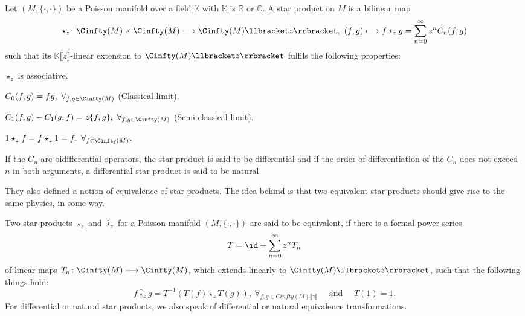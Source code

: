 \begin{definition}
	\label{Def:StarProduct}
	Let $(M, \{\cdot, \cdot\})$ be a Poisson manifold over a field 
	$\mathbb{K}$ with $\mathbb{K}$ is $\mathbb{R}$ or  $\mathbb{C}$.
	A star product on $M$ is a bilinear map
	\begin{equation*}
	    \star_z \colon 
    	\Cinfty(M) 
    	\times 
	    \Cinfty(M) 
	    \longrightarrow
	    \Cinfty(M) \llbracket z \rrbracket
	    , \
	    (f,g) 
	    \longmapsto 
	    f \star_z g 
	    =
	    \sum\limits_{n = 0}^\infty 
	    z^n C_n(f,g)
	\end{equation*}
	such that its $\mathbb{K}\llbracket z \rrbracket$-linear extension to 
	$\Cinfty(M) \llbracket z \rrbracket$ fulfils the following properties:
	\begin{definitionlist}
		\item
		$\star_z$ is associative.
		
		\item
		$C_0(f, g) = f g,\ \forall_{f,g \in \Cinfty(M)}$ (Classical limit).
		
		\item
		$C_1(f, g) - C_1(g, f)= z \{f, g\},\ \forall_{f,g \in \Cinfty(M)}$
		(Semi-classical limit).
		
		\item
		$1 \star_z f = f \star_z 1 = f,\ \forall_{f \in \Cinfty(M)}$.
	\end{definitionlist}
	If the $C_n$ are bidifferential operators, the star product is said to be 
	differential and if the order of differentiation of the $C_n$ does not 
	exceed $n$ in both arguments, a differential star product is said to be 
	natural.
\end{definition}
They also defined a notion of equivalence of star products. The idea behind is 
that two equivalent star products should give rise to the same physics, in some 
way.
\begin{definition}
	Two star products $\star_z$ and $\widehat{\star}_z$ for a Poisson manifold 
	$(M, \{\cdot, \cdot\})$ are said to be equivalent, if there is a formal 
	power series
	\begin{equation*}
		T
		=
		\id +
		\sum\limits_{n=0}^{\infty}
		z^n T_n
	\end{equation*}
	of linear maps $T_n \colon \Cinfty(M) \longrightarrow \Cinfty(M)$, which 
	extends linearly to $\Cinfty(M) \llbracket z \rrbracket$, such that the 
	following things hold:
	\begin{equation*}
		f \widehat{\star}_z g
		=
		T^{-1}
		\left(
			T(f) \star_z T(g)
		\right)
		, \ 
		\forall_{f,g \in Cinfty(M) \llbracket z \rrbracket}
		\quad \text{ and } \quad
		T(1) 
		= 
		1.
	\end{equation*}
	For differential or natural star products, we also speak of differential or 
	natural equivalence transformations.
\end{definition}
